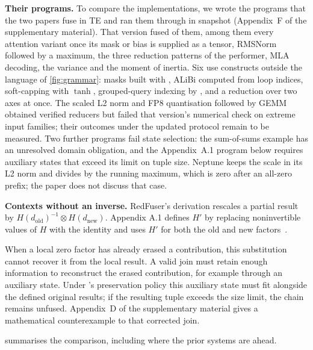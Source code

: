 \textbf{Their programs.}
To compare the implementations, we wrote the \nPriorPrograms programs that the two papers fuse in TE and ran them through \sys in snapshot  (Appendix~F of the supplementary material).
That version fused \nPriorFused of them, among them every attention variant once its mask or bias is supplied as a tensor, RMSNorm followed by a maximum, the three reduction patterns of the performer, MLA decoding, the variance and the moment of inertia.
Six use constructs outside the language of \cref{fig:grammar}: masks built with , ALiBi computed from loop indices, soft-capping with $\tanh$, grouped-query indexing by , and a reduction over two axes at once.
The scaled L2 norm and FP8 quantisation followed by GEMM obtained verified reducers but failed that version's numerical check on extreme input families; their outcomes under the updated protocol remain to be measured.
Two further programs fail state selection: the sum-of-sums example has an unresolved domain obligation, and the Appendix~A.1 program below requires auxiliary states that exceed its limit on tuple size.
Neptune keeps the scale in its L2 norm and divides by the running maximum, which is zero after an all-zero prefix; the paper does not discuss that case.

\textbf{Contexts without an inverse.}
RedFuser's derivation rescales a partial result by $H(d_{\mathrm{old}})^{-1}\otimes H(d_{\mathrm{new}})$.
Appendix A.1 defines $H'$ by replacing noninvertible values of $H$ with the identity and uses $H'$ for both the old and new factors~\citep[Eq.~27--28]{redfuser}.

\label{ex:a1}
When a local zero factor has already erased a contribution, this substitution cannot recover it from the local result.
A valid join must retain enough information to reconstruct the erased contribution, for example through an auxiliary state.
Under \sys's preservation policy this auxiliary state must fit alongside the defined original results; if the resulting tuple exceeds the size limit, the chain remains unfused.
Appendix~D of the supplementary material gives a mathematical counterexample to that corrected join.

 summarises the comparison, including where the prior systems are ahead.

